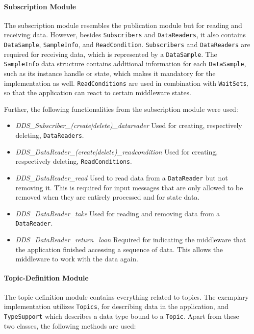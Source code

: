 \paragraph{Subscription Module}
The subscription module resembles the publication module but for reading and receiving data.
However, besides \texttt{Subscribers} and \texttt{DataReaders}, it also contains \texttt{DataSample}, \texttt{SampleInfo}, and \texttt{ReadCondition}.
\texttt{Subscribers} and \texttt{DataReaders} are required for receiving data, which is represented by a \texttt{DataSample}.
The \texttt{SampleInfo} data structure contains additional information for each \texttt{DataSample}, such as its instance handle or state, which makes it mandatory for the implementation as well.
\texttt{ReadConditions} are used in combination with \texttt{WaitSets}, so that the application can react to certain middleware states.

Further, the following functionalities from the subscription module were used:

\begin{itemize}
\item \textit{DDS\_Subscriber\_(create|delete)\_datareader} Used for creating, respectively deleting, \texttt{DataReaders}.
\item \textit{DDS\_DataReader\_(create|delete)\_readcondition} Used for creating, respectively deleting, \texttt{ReadConditions}.
\item \textit{DDS\_DataReader\_read} Used to read data from a \texttt{DataReader} but not removing it. This is required for input messages that are only allowed to be removed when they are entirely processed and for state data.
\item \textit{DDS\_DataReader\_take} Used for reading and removing data from a \texttt{DataReader}.
\item \textit{DDS\_DataReader\_return\_loan} Required for indicating the middleware that the application finished accessing a sequence of data. This allows the middleware to work with the data again.
\end{itemize}

\paragraph{Topic-Definition Module}
The topic definition module contains everything related to topics.
The exemplary implementation utilizes \texttt{Topics}, for describing data in the application, and \texttt{TypeSupport} which describes a data type bound to a \texttt{Topic}.
Apart from these two classes, the following methods are used:


